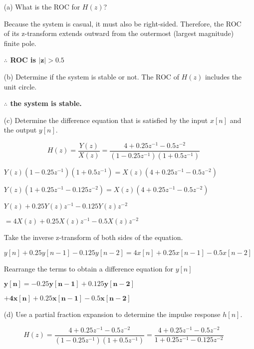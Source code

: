 \documentclass[fleqn]{article}
\begin{document}
\begin{enumerate}[nolistsep]
			\begin{enumerate}[nolistsep]
				\item[(a)] What is the ROC for $H(z)$?
				
					Because the system is casual, it must also be right-sided. Therefore, the ROC of its z-transform extends outward from
the outermost (largest magnitude) finite pole.

					\textbf{$\mathbf{\therefore}$ ROC is $\mathbf{|z| > 0.5}$}
					
				\item[(b)] Determine if the system is stable or not.
					The ROC of $H(z)$ includes the unit circle.
				
					\textbf{$\mathbf{\therefore}$ the system is stable.}
				 
				 \item[(c)] Determine the difference equation that is satisfied by the input $x[n]$ and the output $y[n]$.
				 
				 	\begin{equation*}
				 		H(z) = \frac{Y(z)}{X(z)} = \frac{4 + 0.25z^{-1}-0.5z^{-2}}{(1-0.25z^{-1})(1 + 0.5z^{-1})}
				 	\end{equation*}
				 	
				 	$Y(z)(1-0.25z^{-1})(1 + 0.5z^{-1}) = X(z)(4 + 0.25z^{-1}-0.5z^{-2})$
				 	
				 	$Y(z)(1 + 0.25z^{-1} - 0.125z^{-2}) = X(z)(4 + 0.25z^{-1}-0.5z^{-2})$
				 	
				 	$Y(z) + 0.25Y(z)z^{-1} - 0.125Y(z)z^{-2}$
				 	
				 	$= 4X(z) + 0.25X(z)z^{-1}-0.5X(z)z^{-2}$
				 	
				 	Take the inverse z-transform of both sides of the equation.
				 	
				 	$y[n] + 0.25y[n-1] - 0.125y[n-2] = 4x[n] + 0.25x[n-1] - 0.5x[n-2]$
				 	
				 	Rearrange the terms to obtain a difference equation for $y[n]$
				 	
				 	$\mathbf{y[n] = -0.25y[n-1] + 0.125y[n-2]}$
				 	
				 	$\mathbf{ + 4x[n] + 0.25x[n-1] - 0.5x[n-2]}$
				 	
				 \item[(d)] Use a partial fraction expansion to determine the impulse response $h[n]$.
				 
				 	\begin{equation*}
				 		H(z) = \frac{4 + 0.25z^{-1}-0.5z^{-2}}{(1-0.25z^{-1})(1 + 0.5z^{-1})} = \frac{4 + 0.25z^{-1}-0.5z^{-2}}{1 + 0.25z^{-1} - 0.125z^{-2}}
				 	\end{equation*}
				 	

\end{enumerate}
\end{enumerate}
\end{document}
